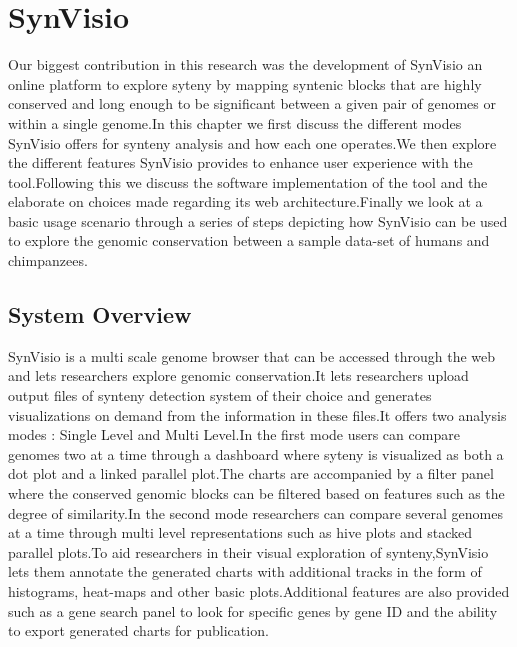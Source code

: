 \chapter{SynVisio}

Our biggest contribution in this research was the development of SynVisio an online platform to explore syteny by mapping syntenic blocks that are highly conserved and long enough to be significant between a given pair of genomes or within a single genome.In this chapter we first discuss the different modes SynVisio offers for synteny analysis and how each one operates.We then explore the different features SynVisio provides to enhance user experience with the tool.Following this we discuss the software implementation of the tool and the elaborate on choices made regarding its web architecture.Finally we look at a basic usage scenario through a series of steps depicting how SynVisio can be used to explore the genomic conservation between a sample data-set of humans and chimpanzees.

\section{System Overview}
SynVisio is a multi scale genome browser that can be accessed through the web and lets researchers explore genomic conservation.It lets researchers upload output files of synteny detection system of their choice and generates visualizations on demand from the information in these files.It offers two analysis modes : Single Level and Multi Level.In the first mode users can compare genomes two at a time through a dashboard where syteny is visualized as both a dot plot and a linked parallel plot.The charts are accompanied by a filter panel where the conserved genomic blocks can be filtered based on features such as the degree of similarity.In the second mode researchers can compare several genomes at a time through multi level representations such as hive plots and stacked parallel plots.To aid researchers in their visual exploration of synteny,SynVisio lets them annotate the generated charts with additional tracks in the form of histograms, heat-maps and other basic plots.Additional features are also provided such as a gene search panel to look for specific genes by gene ID and the ability to export generated charts for publication.


